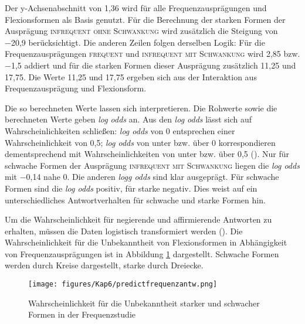 \begin{sloppypar}
Der y-Achsenabschnitt von 1,36 wird für alle Frequenzausprägungen und Flexionsformen als Basis genutzt.  Für die Berechnung der starken Formen der Ausprägung \textsc{infrequent ohne Schwankung} wird zusätzlich die Steigung von −20,9 berücksichtigt. Die anderen Zeilen folgen derselben Logik: Für die Frequenzausprägungen \textsc{frequent} und \textsc{infrequent mit Schwankung} wird 2,85 bzw. −1,5 addiert und für die starken Formen dieser Ausprägung zusätzlich 11,25 und 17,75. Die Werte 11,25 und 17,75 ergeben sich aus der Interaktion aus Frequenzausprägung und Flexionsform. 
\end{sloppypar}

  
Die  so berechneten Werte lassen sich interpretieren. Die Rohwerte sowie die berechneten Werte geben \textit{log odds} an. Aus den \textit{log odds} lässt sich auf Wahrscheinlichkeiten schließen: \textit{log odds} von 0 entsprechen einer Wahrscheinlichkeit von 0,5; \textit{log odds} von unter bzw. über 0 korrespondieren dementsprechend mit  Wahrscheinlichkeiten von unter bzw. über 0,5 (\cite[203--204]{Winter.2020}). Nur für schwache Formen der Ausprägung \textsc{infrequent mit Schwankung} liegen die \textit{log odds} mit −0,14 nahe 0. Die anderen \textit{logg odds} sind klar ausgeprägt. Für schwache Formen sind die \textit{log odds} positiv, für starke negativ. Dies weist auf ein unterschiedliches Antwortverhalten für schwache und starke Formen hin. 

Um die Wahrscheinlichkeit für negierende und affirmierende Antworten zu erhalten, müssen die Daten logistisch transformiert werden (\cite[206]{Winter.2020}). Die Wahrscheinlichkeit für die Unbekanntheit von Flexionsformen in Abhängigkeit von Frequenzausprägungen ist in Abbildung \ref{freqantwortestimates} dargestellt. Schwache Formen werden durch Kreise dargestellt, starke durch Dreiecke. 

\begin{figure}
\texttt{[image: figures/Kap6/predictfrequenzantw.png]} 
\caption{Wahrscheinlichkeit für die Unbekanntheit starker und schwacher Formen in der Frequenzstudie}
\label{freqantwortestimates}
\end{figure}

